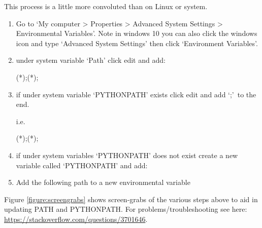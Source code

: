 This process is a little more convoluted than on Linux or \mac system.

\begin{enumerate}
\item Go to `My computer > Properties > Advanced System Settings > Environmental Variables'. Note in windows 10 you can also click the windows icon and type `Advanced System Settings' then click `Environment Variables'.


\item under system variable `Path' click edit and add:
\begin{textbox}[title={In "Environmental Variables"}]
(*\InstallDIR*);(*\InstallDIR*)\INTROOT\bin;
\end{textbox}

\item if under system variable `PYTHONPATH' exists click edit and add `\InstallDIR;'\, to the end.

\noindent i.e.

\begin{textbox}[title={In "Environmental Variables"}]
(*\InstallDIR*);(*\InstallDIR*)\INTROOT\bin;
\end{textbox}

\item if under system variables `PYTHONPATH' does not exist create a new variable called `PYTHONPATH' and add:

\begin{textbox}[title={In "Environmental Variables"}]
\end{textbox}

\item Add the following path to a new environmental variable
\begin{textbox}[title={In "Environmental Variables"}]
\end{textbox}

\end{enumerate}

\noindent Figure \ref{figure:screengrabs} shows screen-grabs of the various steps above to aid in updating PATH and PYTHONPATH.
\vspace{0.25cm}
\noindent For problems/troubleshooting see here: \url{https://stackoverflow.com/questions/3701646}.

